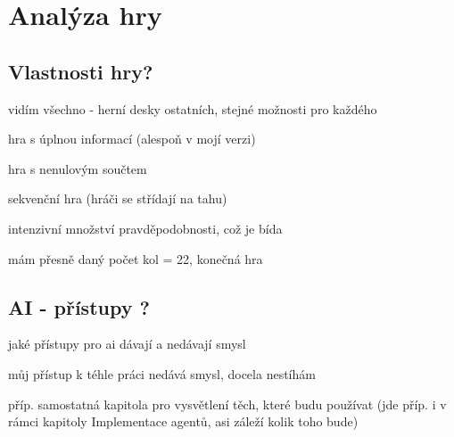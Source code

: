\chapter{Analýza hry}

\section{Vlastnosti hry?}
vidím všechno - herní desky ostatních, stejné možnosti pro každého

hra s úplnou informací (alespoň v mojí verzi)

hra s nenulovým součtem

sekvenční hra (hráči se střídají na tahu)

intenzivní množství pravděpodobnosti, což je bída

mám přesně daný počet kol = 22, konečná hra


\section{AI - přístupy ?}
jaké přístupy pro ai dávají a nedávají smysl

můj přístup k téhle práci nedává smysl, docela nestíhám

příp. samostatná kapitola pro vysvětlení těch, které budu používat (jde příp. i v rámci kapitoly Implementace agentů, asi záleží kolik toho bude)

